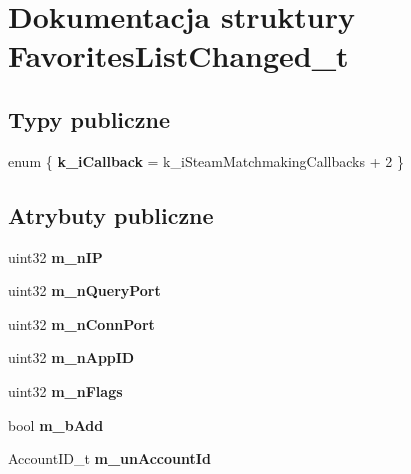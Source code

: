 \hypertarget{struct_favorites_list_changed__t}{}\section{Dokumentacja struktury Favorites\+List\+Changed\+\_\+t}
\label{struct_favorites_list_changed__t}
\subsection*{Typy publiczne}
\begin{DoxyCompactItemize}
\item 
\mbox{\label{struct_favorites_list_changed__t_ad0a4dfacab441e44e2e4b82f5d928bae}} 
enum \{ {\bfseries k\+\_\+i\+Callback} = k\+\_\+i\+Steam\+Matchmaking\+Callbacks + 2
 \}
\end{DoxyCompactItemize}
\subsection*{Atrybuty publiczne}
\begin{DoxyCompactItemize}
\item 
\mbox{\label{struct_favorites_list_changed__t_a6633b739e7f8362052c270f8a7c39735}} 
uint32 {\bfseries m\+\_\+n\+IP}
\item 
\mbox{\label{struct_favorites_list_changed__t_ab4c3b208cc5723b3ce21ba67df58f820}} 
uint32 {\bfseries m\+\_\+n\+Query\+Port}
\item 
\mbox{\label{struct_favorites_list_changed__t_a823733cc68b43103a4de9a683281c45a}} 
uint32 {\bfseries m\+\_\+n\+Conn\+Port}
\item 
\mbox{\label{struct_favorites_list_changed__t_a40e8e04d52a690119dde9e5b5ef9d8f8}} 
uint32 {\bfseries m\+\_\+n\+App\+ID}
\item 
\mbox{\label{struct_favorites_list_changed__t_a8e3a7634a9f0f1a39ba2bf87b635f278}} 
uint32 {\bfseries m\+\_\+n\+Flags}
\item 
\mbox{\label{struct_favorites_list_changed__t_aff8f37b36436aa74f853a216413027d1}} 
bool {\bfseries m\+\_\+b\+Add}
\item 
\mbox{\label{struct_favorites_list_changed__t_a6a03a273d2d0c6c6e340a6c56b9c6ca3}} 
Account\+I\+D\+\_\+t {\bfseries m\+\_\+un\+Account\+Id}
\end{DoxyCompactItemize}


